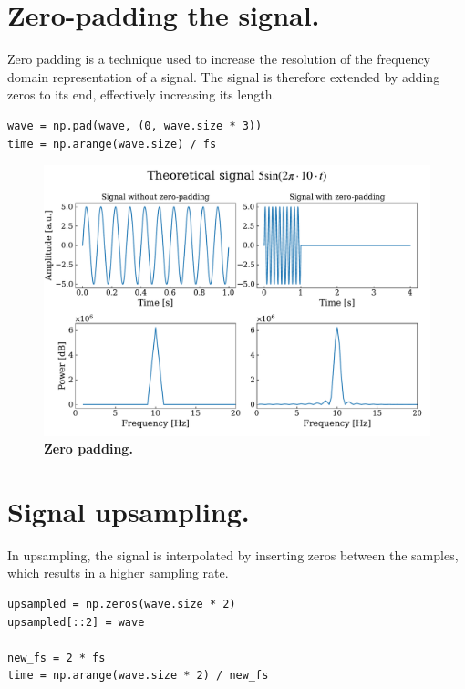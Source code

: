 \documentclass[13pt,a4paper]{article}
\begin{document}
\section{Zero-padding the signal.}

Zero padding is a technique used to increase the resolution of the frequency domain representation of a signal. The signal is therefore extended by adding zeros to its end, effectively increasing its length.

\begin{lstlisting}[caption={\textbf{Code snippet for adding the padding to infinite signal.}}]
wave = np.pad(wave, (0, wave.size * 3))
time = np.arange(wave.size) / fs
\end{lstlisting}

\begin{figure}[ht!]
    \centering
    \includegraphics[width=\linewidth]{zero_pad.pdf}
    \caption{\textbf{Zero padding.}}
    \label{fig:zero_padding}
\end{figure}
\pagebreak


\section{Signal upsampling.}

In upsampling, the signal is interpolated by inserting zeros between the samples, which results in a higher sampling rate.

\begin{lstlisting}[caption={\textbf{Code snippet for upsampling the signal.}}]
upsampled = np.zeros(wave.size * 2)
upsampled[::2] = wave

new_fs = 2 * fs
time = np.arange(wave.size * 2) / new_fs
\end{lstlisting}
\end{document}

